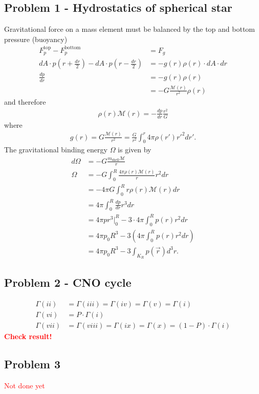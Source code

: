 \documentclass[10pt,a4paper]{book}
\theoremstyle{definition}
\begin{document}
\subsection{Problem 1 - Hydrostatics of spherical star}
Gravitational force on a mass element must be balanced by the top and bottom pressure (buoyancy)
\begin{align}
    F_p^\text{top}-F_p^\text{bottom}&=F_g\\
    dA\cdot p\left(r+\frac{dr}{2}\right)-dA\cdot p\left(r-\frac{dr}{2}\right)&=-g(r)\rho(r)\cdot dA\cdot dr\\
    \frac{dp}{dr} &=-g(r)\rho(r)\\
    &=-G\frac{\mathcal{M}(r)}{r^2}\rho(r)
\end{align}
and therefore
\begin{align}
   \rho(r)\mathcal{M}(r)=-\frac{dp}{dr}\frac{r^2}{G}
\end{align}
where
\begin{align}
    g(r)=G\frac{\mathcal{M}(r)}{r^2}=\frac{G}{r^2}\int_0^r4\pi\rho(r')r'^2dr'.
\end{align}
The gravitational binding energy $\Omega$ is given by
\begin{align}
    d\Omega&=-G\frac{m_\text{shell}\mathcal{M}}{r}\\
    \Omega&=-G\int_0^R\frac{4\pi\rho(r)\mathcal{M}(r)}{r}r^2dr\\
    &=-4\pi G\int_0^Rr\rho(r)\mathcal{M}(r)dr\\
    &=4\pi\int_0^R\frac{dp}{dr}r^3dr\\
    &=4\pi p r^3|_0^R - 3\cdot4\pi\int_0^Rp(r)r^2dr\\
    &=4\pi p_0 R^3 - 3\left(4\pi\int_0^Rp(r)r^2dr\right)\\
    &=4\pi p_0 R^3 - 3\int_{K_R}p(\vec{r})d^3r.
\end{align}
\subsection{Problem 2 - CNO cycle}
\begin{align}
    \Gamma(ii)&=\Gamma(iii)=\Gamma(iv)=\Gamma(v)=\Gamma(i)\\
    \Gamma(vi)&=P\cdot\Gamma(i)\\
    \Gamma(vii)&=\Gamma(viii)=\Gamma(ix)=\Gamma(x)=(1-P)\cdot\Gamma(i)
\end{align}
\textcolor{red}{\bf Check result!}

\subsection{Problem 3}
\textcolor{red}{Not done yet}
\end{document}
